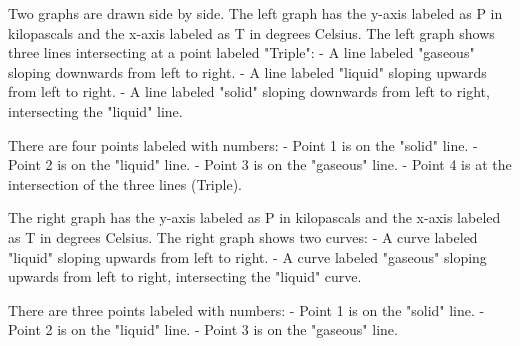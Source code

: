 Two graphs are drawn side by side. The left graph has the y-axis labeled as P in kilopascals and the x-axis labeled as T in degrees Celsius. The left graph shows three lines intersecting at a point labeled "Triple":
- A line labeled "gaseous" sloping downwards from left to right.
- A line labeled "liquid" sloping upwards from left to right.
- A line labeled "solid" sloping downwards from left to right, intersecting the "liquid" line.

There are four points labeled with numbers:
- Point 1 is on the "solid" line.
- Point 2 is on the "liquid" line.
- Point 3 is on the "gaseous" line.
- Point 4 is at the intersection of the three lines (Triple).

The right graph has the y-axis labeled as P in kilopascals and the x-axis labeled as T in degrees Celsius. The right graph shows two curves:
- A curve labeled "liquid" sloping upwards from left to right.
- A curve labeled "gaseous" sloping upwards from left to right, intersecting the "liquid" curve.

There are three points labeled with numbers:
- Point 1 is on the "solid" line.
- Point 2 is on the "liquid" line.
- Point 3 is on the "gaseous" line.